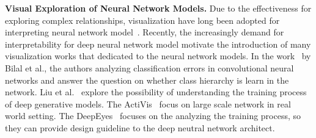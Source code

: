 \textbf{Visual Exploration of Neural Network Models.}
Due to the effectiveness for exploring complex relationships, visualization have long been adopted for interpreting neural network model~\cite{TzengMa2005}.
Recently, the increasingly demand for interpretability for deep neural network model motivate the introduction of many visualization works that dedicated to the neural network models.
In the work~\cite{BilalJourablooYe2018} by Bilal et al., the authors analyzing classification errors in convolutional neural networks and answer the question on whether class hierarchy is learn in the network.
Liu et al.~\cite{LiuShiCao2018} explore the possibility of understanding the training process of deep generative models.
The ActiVis~\cite{KahngAndrewsKalro2018} focus on large scale network in real world setting.
The DeepEyes~\cite{Pezzotti2018} focuses on the analyzing the training process, so they can provide design guideline to the deep neutral network architect.


